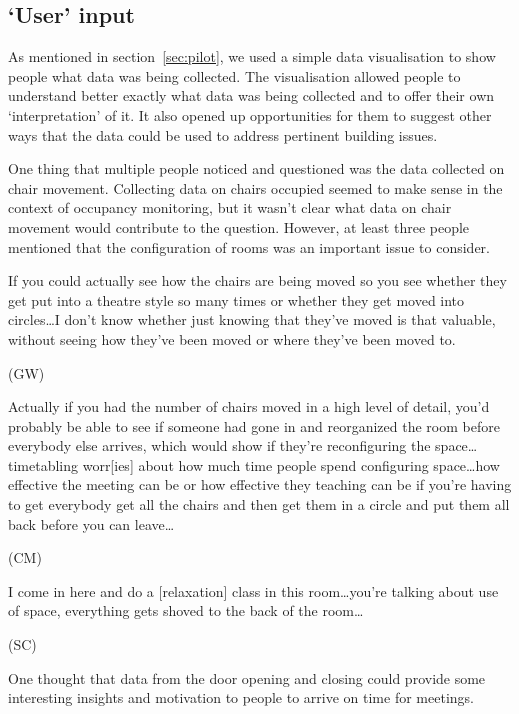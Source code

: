 \subsection{`User' input}
\label{sec:user-input}


As mentioned in section~\ref{sec:pilot}, we used a simple data
visualisation to show people what data was being collected. The
visualisation allowed people to understand better exactly what data
was being collected and to offer their own ‘interpretation’ of it. It
also opened up opportunities for them to suggest other ways that the
data could be used to address pertinent building issues.

One thing that multiple people noticed and questioned was the data
collected on chair movement. Collecting data on chairs occupied seemed
to make sense in the context of occupancy monitoring, but it wasn’t
clear what data on chair movement would contribute to the
question. However, at least three people mentioned that the
configuration of rooms was an important issue to consider.

\begin{qt}If you could actually see how the chairs are being moved so you see
whether they get put into a theatre style so many times or whether
they get moved into circles\ldots{}I don’t know whether just knowing that
they’ve moved is that valuable, without seeing how they’ve been moved
or where they’ve been moved to.\end{qt} (GW)

\begin{qt}Actually if you had the number of chairs moved in a high level of
detail, you’d probably be able to see if someone had gone in and
reorganized the room before everybody else arrives, which would show
if they’re reconfiguring the space\ldots timetabling worr[ies] about how
much time people spend configuring space\ldots{}how effective the meeting can
be or how effective they teaching can be if you’re having to get
everybody get all the chairs and then get them in a circle and put
them all back before you can leave\ldots{}\end{qt} (CM)

\begin{qt}I come in here and do a [relaxation] class in this room\ldots{}you’re
talking about use of space, everything gets shoved to the back of the
room\ldots \end{qt} (SC)

One thought that data from the door opening and closing could provide
some interesting insights and motivation to people to arrive on time
for meetings.

